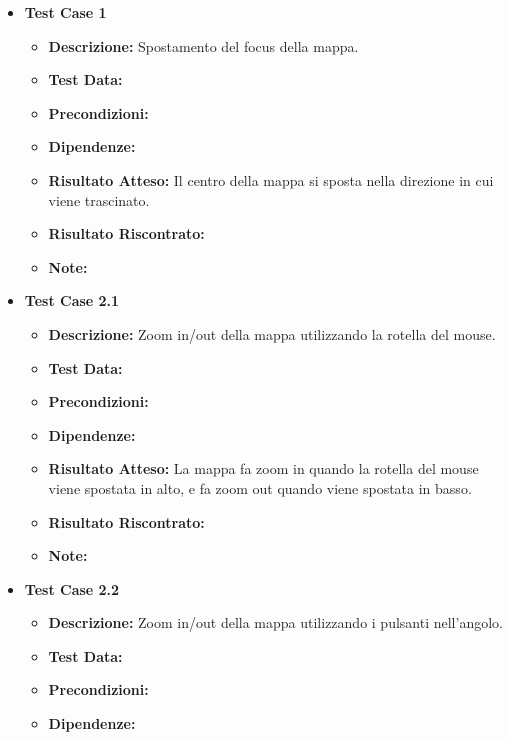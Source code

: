         \begin{itemize}
            \item \textbf{Test Case 1}
                \begin{itemize}
                    \item \textbf{Descrizione:} Spostamento del focus della mappa.
                    \item \textbf{Test Data:}
                    \item \textbf{Precondizioni:} 
                    \item \textbf{Dipendenze:}
                    \item \textbf{Risultato Atteso:} Il centro della mappa si sposta nella direzione in cui viene trascinato.
                    \item \textbf{Risultato Riscontrato:}
                    \item \textbf{Note:}
                \end{itemize}
            \item \textbf{Test Case 2.1}
                \begin{itemize}
                    \item \textbf{Descrizione:} Zoom in/out della mappa utilizzando la rotella del mouse.
                    \item \textbf{Test Data:}
                    \item \textbf{Precondizioni:} 
                    \item \textbf{Dipendenze:}
                    \item \textbf{Risultato Atteso:} La mappa fa zoom in quando la rotella del mouse viene spostata in alto, e fa zoom out quando viene spostata in basso.
                    \item \textbf{Risultato Riscontrato:}
                    \item \textbf{Note:}
                \end{itemize}
            \item \textbf{Test Case 2.2}
                \begin{itemize}
                    \item \textbf{Descrizione:} Zoom in/out della mappa utilizzando i pulsanti nell'angolo.
                    \item \textbf{Test Data:}
                    \item \textbf{Precondizioni:} 
                    \item \textbf{Dipendenze:}

\end{itemize}
\end{itemize}

